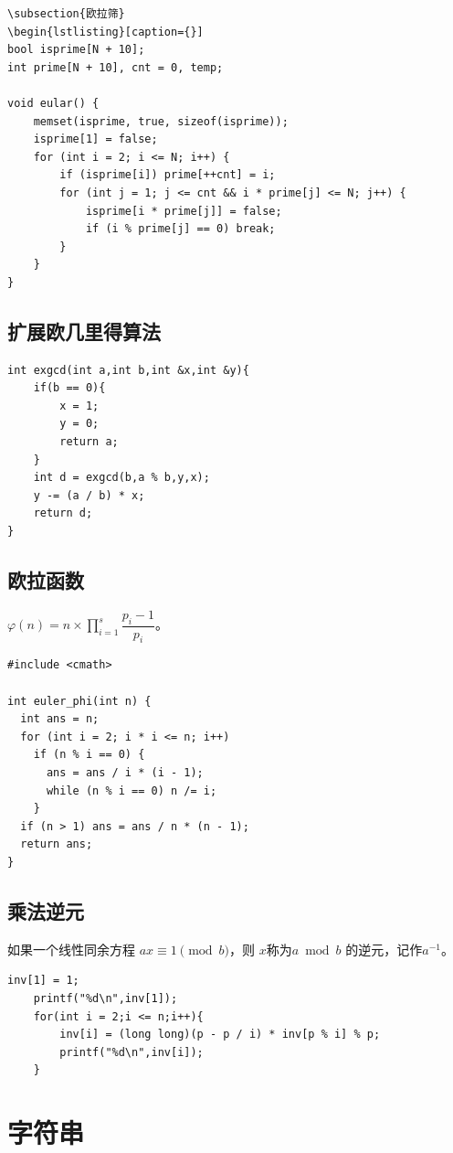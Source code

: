 \documentclass[10pt,a4paper]{article}
\begin{document}
\begin{lstlisting}[caption={}]
\subsection{欧拉筛}
\begin{lstlisting}[caption={}]
bool isprime[N + 10];
int prime[N + 10], cnt = 0, temp;

void eular() {
    memset(isprime, true, sizeof(isprime));
    isprime[1] = false;
    for (int i = 2; i <= N; i++) {
        if (isprime[i]) prime[++cnt] = i;
        for (int j = 1; j <= cnt && i * prime[j] <= N; j++) {
            isprime[i * prime[j]] = false;
            if (i % prime[j] == 0) break;
        }
    }
}
\end{lstlisting}

\subsection{扩展欧几里得算法}
\begin{lstlisting}[caption={}]
int exgcd(int a,int b,int &x,int &y){
	if(b == 0){
		x = 1;
		y = 0;
		return a;
	}
	int d = exgcd(b,a % b,y,x);
	y -= (a / b) * x;
	return d;
}
\end{lstlisting}

\subsection{欧拉函数}
$\varphi(n) = n \times \prod_{i = 1}^s{\dfrac{p_i - 1}{p_i}}$。

\begin{lstlisting}[caption={}]
#include <cmath>

int euler_phi(int n) {
  int ans = n;
  for (int i = 2; i * i <= n; i++)
    if (n % i == 0) {
      ans = ans / i * (i - 1);
      while (n % i == 0) n /= i;
    }
  if (n > 1) ans = ans / n * (n - 1);
  return ans;
}
\end{lstlisting}

\subsection{乘法逆元}
如果一个线性同余方程 $ax \equiv 1 \pmod b$，则 $x $称为$ a \bmod b$ 的逆元，记作$ a^{-1}$。
\begin{lstlisting}[caption={}]
inv[1] = 1;
	printf("%d\n",inv[1]);
	for(int i = 2;i <= n;i++){
		inv[i] = (long long)(p - p / i) * inv[p % i] % p;
		printf("%d\n",inv[i]);
	}
\end{lstlisting}


\section{字符串}
\end{document}
